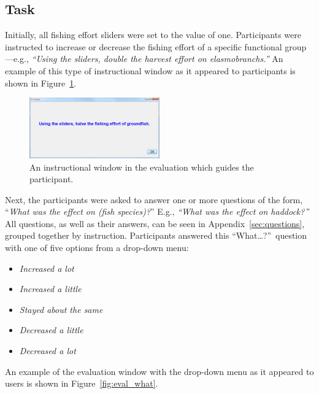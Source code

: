 \subsection{Task}

Initially, all fishing effort sliders were set to the value of one.  Participants were instructed to increase or decrease the fishing effort of a specific functional group---e.g., \textit{``Using the sliders, double the harvest effort on elasmobranchs.''}  An example of this type of instructional window as it appeared to participants is shown in Figure~\ref{fig:eval_inst}.

\begin{figure}[h]
	\centering
	\includegraphics[width=0.5\textwidth]{figures/png/eval_instr.png}
	\caption[An instructional window in the evaluation which guides the participant]{An instructional window in the evaluation which guides the participant.}
	\label{fig:eval_inst}
\end{figure}

Next, the participants were asked to answer one or more questions of the form, ``\textit{What was the effect on (fish species)?}''  E.g., \textit{``What was the effect on haddock?''}  All questions, as well as their answers, can be seen in Appendix~\ref{sec:questions}, grouped together by instruction.  Participants answered this ``What\ldots?''\ question with one of five options from a drop-down menu:
\begin{itemize}
\item \textit{Increased a lot}
\item \textit{Increased a little}
\item \textit{Stayed about the same}
\item \textit{Decreased a little}
\item \textit{Decreased a lot}
\end{itemize}
An example of the evaluation window with the drop-down menu as it appeared to users is shown in Figure~\ref{fig:eval_what}.

